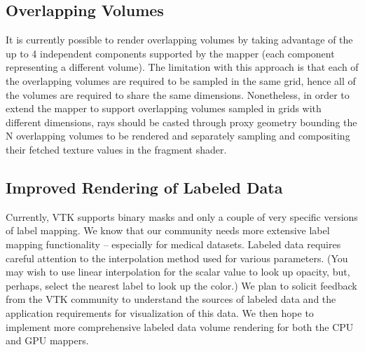 \subsection{Overlapping Volumes}
\label{overlapping-volumes}
It is currently possible to render overlapping volumes by taking advantage of
the up to 4 independent components supported by the mapper (each component
representing a different volume).
The limitation with this approach is that each of the overlapping volumes are
required to be sampled in the same grid, hence all of the volumes are required
to share the same dimensions.  Nonetheless, in order to extend the mapper to
support overlapping volumes sampled in grids with different dimensions, rays
should be casted through proxy geometry bounding the N overlapping volumes to be
rendered and separately sampling and compositing their fetched texture values in
the fragment shader.

\subsection{Improved Rendering of Labeled Data}
\label{improved-rendering-of-labeled-data}
Currently, VTK supports binary masks and only a couple of very specific versions
of label mapping. We know that our community needs more extensive label mapping
functionality – especially for medical datasets. Labeled data requires careful
attention to the interpolation method used for various parameters. (You may wish
to use linear interpolation for the scalar value to look up opacity, but,
perhaps, select the nearest label to look up the color.) We
plan to solicit feedback from the VTK community to understand the sources of
labeled data and the application requirements for visualization of this data. We
then hope to implement more comprehensive labeled data volume rendering for both
the CPU and GPU mappers.
